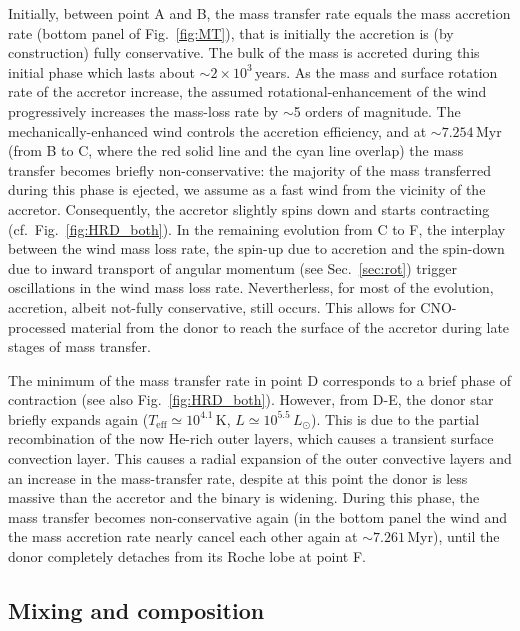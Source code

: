 \documentclass[twocolumn,twocolappendix,trackchanges]{aastex63}
\DeclareRobustCommand{\Figref}[1]{Fig.~\ref{#1}}
\DeclareRobustCommand{\Secref}[1]{Sec.~\ref{#1}}
\begin{document}
Initially, between point A and B, the mass transfer rate equals the mass accretion rate
(bottom panel of \Figref{fig:MT}), that is initially the accretion is
(by construction) fully conservative. The bulk of the mass is accreted
during this initial phase which lasts about $\sim{}2\times10^3$\,years. As the mass and surface rotation
rate of the accretor increase, the assumed rotational-enhancement of
the wind progressively increases the mass-loss rate by $\sim$5 orders
of magnitude. The mechanically-enhanced wind
controls the accretion efficiency, and at
$\sim$$7.254$\,Myr (from B to C, where the red solid line and the cyan line overlap) the mass transfer becomes briefly non-conservative: the majority of the mass transferred during this phase is ejected, we assume as a fast wind from the vicinity of the accretor. Consequently, the accretor slightly spins down and starts contracting (cf.~\Figref{fig:HRD_both}).
In the remaining evolution from C to F, the interplay between the wind mass loss rate, the spin-up due to accretion and the spin-down due to inward transport of angular momentum (see \Secref{sec:rot}) trigger oscillations in the wind mass loss rate. Nevertherless, for most of the evolution, accretion, albeit not-fully conservative, still occurs. This allows for CNO-processed material from the donor to reach the surface of the accretor during late stages of mass transfer.

The minimum of the mass transfer rate in point D corresponds to a brief phase of contraction (see also \Figref{fig:HRD_both}). However, from D-E, the donor star briefly expands again
($T_\mathrm{eff}\simeq10^{4.1}$\,K, $L\simeq10^{5.5}\,L_\odot$). This
is due to the partial recombination of the now He-rich outer layers,
which causes a transient surface convection layer. This causes a
radial expansion of the outer convective layers and an increase in the
mass-transfer rate, despite at this point the donor is less massive
than the accretor and the binary is widening.  During this phase, the
mass transfer becomes non-conservative again (in the bottom
panel the wind and the mass accretion rate nearly cancel each other again
at $\sim7.261$\,Myr), until the donor completely detaches from its Roche lobe at point F.

\subsection{Mixing and composition}
\label{sec:mixing}
\end{document}
